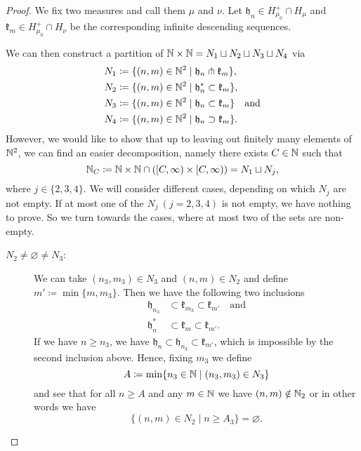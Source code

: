 \begin{proof}
  We fix two measures and call them \(\mu\) and \(\nu\). Let \(\mathfrak{h}_n \in H_{\mu_0}^+ \cap H_\mu\) and \(\mathfrak{k}_m \in H_{\mu_0}^+ \cap H_\nu\) be the corresponding infinite descending sequences.

  We can then construct a partition of \(\mathbb{N} \times \mathbb{N} = N_1 \sqcup N_2 \sqcup N_3 \sqcup N_4\) via
  \begin{align*}
    N_1 & \coloneqq \{(n,m) \in \mathbb{N}^2 \mid \mathfrak{h}_n \pitchfork \mathfrak{k}_m\},\\
    N_2 & \coloneqq \{(n,m) \in \mathbb{N}^2 \mid \mathfrak{h}_n^\ast \subset \mathfrak{k}_m\},\\
    N_3 & \coloneqq \{(n,m) \in \mathbb{N}^2 \mid \mathfrak{h}_n \subset \mathfrak{k}_m\}\quad \text{and}\\
    N_4 & \coloneqq \{(n,m) \in \mathbb{N}^2 \mid \mathfrak{h}_n \supset \mathfrak{k}_m\}.
  \end{align*}
  However, we would like to show that up to leaving out finitely many elements of \(\mathbb{N}^2\), we can find an easier decomposition, namely there exists \(C \in \mathbb{N}\) such that
  \[
    \mathbb{N}_C \coloneqq \mathbb{N} \times \mathbb{N} \cap ([C, \infty) \times [C, \infty)) = N_1 \sqcup N_j,
  \]
  where \(j \in \{2,3,4\}\). We will consider different cases, depending on which \(N_j\) are not empty. If at most one of the \(N_j\ (j = 2,3,4)\)  is not empty, we have nothing to prove. So we turn towards the cases, where at most two of the sets are non-empty.
  \begin{description}
  \item[\(N_2 \neq \varnothing \neq N_3\):] We can take \((n_3, m_3) \in N_3\) and \((n,m) \in N_2\) and define \(m' \coloneqq \min\{m, m_3\}\). Then we have the following two inclusions
    \begin{align*}
      \mathfrak{h}_{n_3} & \subset \mathfrak{k}_{m_3} \subset \mathfrak{k}_{m'} \quad \text{and}\\
      \mathfrak{h}_{n}^\ast & \subset \mathfrak{k}_m \subset \mathfrak{k}_{m'}.
    \end{align*}
    If we have \(n \geq n_3\), we have \(\mathfrak{h}_n \subset \mathfrak{h}_{n_3} \subset \mathfrak{k}_{m'}\), which is impossible by the second inclusion above. Hence, fixing \(m_3\) we define
    \[
      A \coloneqq \min \{n_3 \in \mathbb{N} \mid (n_3, m_3) \in N_3\}
    \]
    and see that for all \(n \geq A\) and any \(m \in \mathbb{N}\) we have \((n,m) \notin \mathbb{N}_2\) or in other words we have
    \[
      \{(n,m) \in N_2 \mid n \geq A_3\} = \varnothing.
\]
\end{description}
\end{proof}
